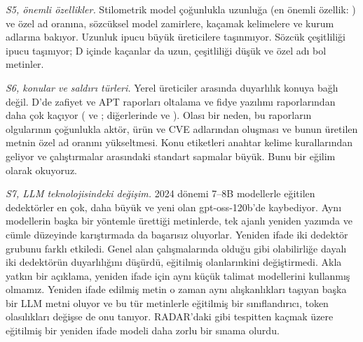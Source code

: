 \documentclass[journal]{IEEEtran}
\begin{document}
\emph{S5, önemli özellikler.} Stilometrik model çoğunlukla uzunluğa (en önemli özellik: \TopFeature{}) ve özel ad
oranına, sözcüksel model zamirlere, kaçamak kelimelere ve kurum adlarına bakıyor. Uzunluk ipucu büyük üreticilere
taşınmıyor. Sözcük çeşitliliği ipucu taşınıyor; D içinde kaçanlar da uzun, çeşitliliği düşük ve özel adı bol
metinler.

\emph{S6, konular ve saldırı türleri.} Yerel üreticiler arasında duyarlılık konuya bağlı değil. D'de zafiyet ve APT
raporları oltalama ve fidye yazılımı raporlarından daha çok kaçıyor (\TopicDVulnerability{} ve \TopicDApt{};
diğerlerinde \TopicDPhishing{} ve \TopicDRansomware{}). Olası bir neden, bu raporların olgularının çoğunlukla
aktör, ürün ve CVE adlarından oluşması ve bunun üretilen metnin özel ad oranını yükseltmesi. Konu etiketleri
anahtar kelime kurallarından geliyor ve çalıştırmalar arasındaki standart sapmalar büyük. Bunu bir eğilim olarak
okuyoruz.

\emph{S7, LLM teknolojisindeki değişim.} 2024 dönemi 7--8B modellerle eğitilen dedektörler en çok, daha büyük ve
yeni olan gpt-oss-120b'de kaybediyor. Aynı modellerin başka bir yöntemle ürettiği metinlerde, tek ajanlı yeniden
yazımda ve cümle düzeyinde karıştırmada da başarısız oluyorlar. Yeniden ifade iki dedektör grubunu farklı etkiledi.
Genel alan çalışmalarında olduğu gibi \cite{Krishna_2023,Sadasivan_2023} olabilirliğe dayalı iki dedektörün
duyarlılığını düşürdü, eğitilmiş olanlarınkini değiştirmedi. Akla yatkın bir açıklama, yeniden ifade için aynı
küçük talimat modellerini kullanmış olmamız. Yeniden ifade edilmiş metin o zaman aynı alışkanlıkları taşıyan başka
bir LLM metni oluyor ve bu tür metinlerle eğitilmiş bir sınıflandırıcı, token olasılıkları değişse de onu tanıyor.
RADAR'daki gibi tespitten kaçmak üzere eğitilmiş bir yeniden ifade modeli \cite{Hu_2023} daha zorlu bir sınama
olurdu.
\end{document}
